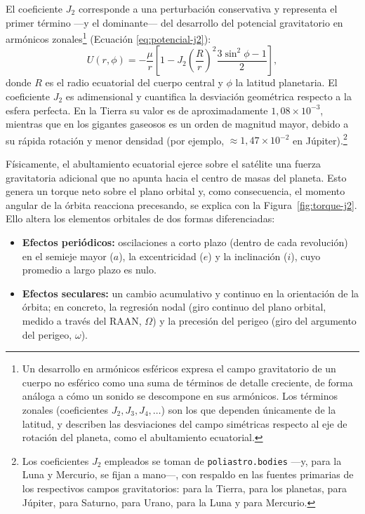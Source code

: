 El coeficiente $J_2$ corresponde a una perturbación conservativa y representa el primer término ---y el dominante--- del desarrollo del potencial gravitatorio en armónicos zonales\footnote{Un desarrollo en armónicos esféricos expresa el campo gravitatorio de un cuerpo no esférico como una suma de términos de detalle creciente, de forma análoga a cómo un sonido se descompone en sus armónicos. Los términos zonales (coeficientes $J_2, J_3, J_4, \dots$) son los que dependen únicamente de la latitud, y describen las desviaciones del campo simétricas respecto al eje de rotación del planeta, como el abultamiento ecuatorial.} (Ecuación \ref{eq:potencial-j2}):
\begin{equation}
  U(r, \phi) = -\frac{\mu}{r} \left[ 1 - J_2 \left(\frac{R}{r}\right)^{2}
  \frac{3\sin^{2}\phi - 1}{2} \right] ,
  \label{eq:potencial-j2}
\end{equation}
donde $R$ es el radio ecuatorial del cuerpo central y $\phi$ la latitud planetaria. El coeficiente $J_2$ es adimensional y cuantifica la desviación geométrica respecto a la esfera perfecta. En la Tierra su valor es de aproximadamente $1{,}08\times10^{-3}$, mientras que en los gigantes gaseosos es un orden de magnitud mayor, debido a su rápida rotación y menor densidad (por ejemplo, $\approx 1{,}47\times10^{-2}$ en Júpiter).\footnote{Los coeficientes $J_2$ empleados se toman de \texttt{poliastro.bodies} ---y, para la Luna y Mercurio, se fijan a mano---, con respaldo en las fuentes primarias de los respectivos campos gravitatorios: \cite{iers2010} para la Tierra, \cite{caltechGE131} para los planetas, \cite{jupiterGravity2019} para Júpiter, \cite{iess2019saturn} para Saturno, \cite{jacobson2014} para Urano, \cite{zuber2013} para la Luna y \cite{mazarico2014} para Mercurio.}

Físicamente, el abultamiento ecuatorial ejerce sobre el satélite una fuerza gravitatoria adicional que no apunta hacia el centro de masas del planeta. Esto genera un torque neto sobre el plano orbital y, como consecuencia, el momento angular de la órbita reacciona precesando, se explica con la Figura~\ref{fig:torque-j2}. Ello altera los elementos orbitales de dos formas diferenciadas:
\begin{itemize}
  \item \textbf{Efectos periódicos:} oscilaciones a corto plazo (dentro de cada revolución) en el semieje mayor ($a$), la excentricidad ($e$) y la inclinación ($i$), cuyo promedio a largo plazo es nulo.
  \item \textbf{Efectos seculares:} un cambio acumulativo y continuo en la orientación de la órbita; en concreto, la regresión nodal (giro continuo del plano orbital, medido a través del \gls{RAAN}, $\Omega$) y la precesión del perigeo (giro del argumento del perigeo, $\omega$).
\end{itemize}

